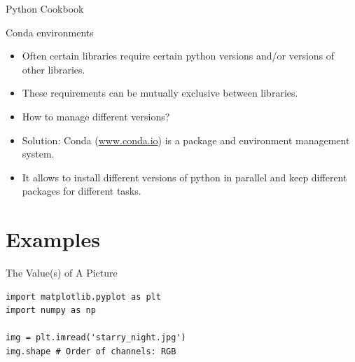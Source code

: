 \documentclass[compress%
,aspectratio=169%
]{beamer}
\begin{document}
\begin{frame}{Python Cookbook}

\begin{figure}
    \centering
    \label{fig:enter-label}
\end{figure}

\end{frame}

\begin{frame}[fragile]{Conda environments}
\begin{itemize}
    \item Often certain libraries require certain python versions and/or versions of other libraries.
    \item These requirements can be mutually exclusive between libraries.
    \item How to manage different versions?
    \item \alert{Solution:} Conda (\url{www.conda.io}) is a package and environment management system.
    \item It allows to install different versions of python in parallel and keep different packages for different tasks.
    
\end{itemize}
\end{frame}




\section{Examples}


\begin{frame}[fragile]{The Value(s) of A Picture}
\begin{figure}
    \centering
\end{figure}
\begin{lstlisting}
import matplotlib.pyplot as plt
import numpy as np

img = plt.imread('starry_night.jpg')
img.shape # Order of channels: RGB
\end{lstlisting}
\end{frame}
\end{document}
